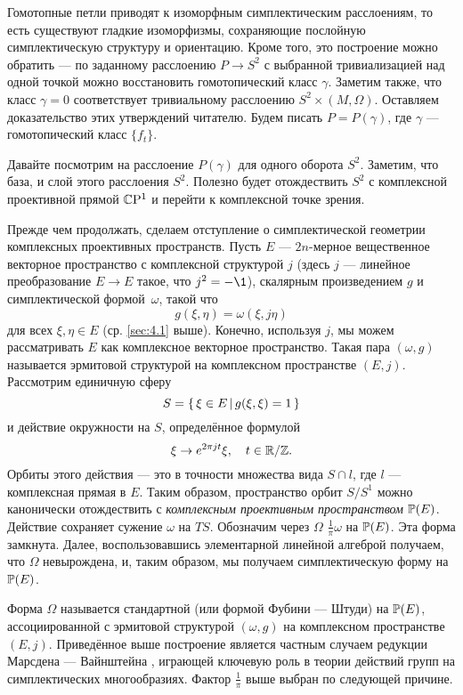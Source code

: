 Гомотопные петли приводят к изоморфным симплектическим расслоениям, то
есть существуют гладкие изоморфизмы, сохраняющие послойную
симплектическую структуру и ориентацию.
Кроме того, это построение можно обратить --- по заданному расслоению
$P \to S^2$ с выбранной тривиализацией над одной точкой можно
восстановить гомотопический класс $\gamma$.
Заметим также, что класс $\gamma = 0$ соответствует тривиальному
расслоению $S^2 \times (M, \Omega)$.
Оставляем доказательство этих утверждений читателю.
Будем писать $P = P(\gamma)$, где $\gamma$ --- гомотопический класс
$\{f_t\}$.

Давайте посмотрим на расслоение $P(\gamma)$ для одного оборота $S^2$.
Заметим, что база, и слой этого расслоения $S^2$.
Полезно будет отождествить $S^2$ с комплексной проективной прямой
$\mathbb{C}\mathrm{P}^1$ и перейти к комплексной точке зрения.

Прежде чем продолжать, сделаем отступление о симплектической геометрии
комплексных проективных пространств. 
Пусть $E$ --- $2n$-мерное вещественное векторное пространство с
комплексной структурой $j$ 
(здесь $j$ --- линейное преобразование $E\to E$ такое, что $j^2 = -\1$),
скалярным произведением $g$ и симплектической формой~$\omega$, такой что
\[g(\xi, \eta ) = \omega(\xi, j\eta)\]
для всех $\xi, \eta \in E$ (ср. \ref{sec:4.1} выше).
Конечно, используя $j$, мы можем рассматривать $E$ как комплексное
векторное пространство. 
Такая пара $(\omega, g)$ называется эрмитовой структурой на
комплексном пространстве $(E, j)$.
Рассмотрим единичную сферу
\[S = \left\{ \,{\xi \in E}\, \middle| \,{g(\xi, \xi) = 1}\, \right\}\]
и действие окружности на $S$, определённое формулой 
\[\xi \to e^{2\pi jt} \xi,\quad t \in \mathbb{R}/\mathbb{Z}.\]
Орбиты этого действия --- это в точности множества вида $S \cap l$,
где $l$ --- комплексная прямая в $E$. 
Таким образом, пространство орбит $S/S^1$ можно канонически
отождествить с \emph{комплексным проективным пространством} $\mathbb{P}(E)$.
Действие сохраняет сужение $\omega$ на $T S$.
Обозначим через $\Omega$
 $\tfrac1\pi \omega$ на $\mathbb{P}(E)$.
Эта форма замкнута.
Далее, воспользовавшись элементарной линейной алгеброй получаем, что
$\Omega$ невырождена, и, таким образом, мы получаем симплектическую
форму на $\mathbb{P}(E)$. 

Форма $\Omega$ называется стандартной (или формой Фубини --- Штуди) на
$\mathbb{P}(E)$, ассоциированной с эрмитовой структурой $(\omega, g)$ на
комплексном пространстве $(E, j)$.
Приведённое выше построение является частным случаем редукции Марсдена
--- Вайнштейна \cite{MS}, играющей ключевую роль в теории действий
групп на симплектических многообразиях.
Фактор $\tfrac1\pi$ выше выбран по следующей причине.

